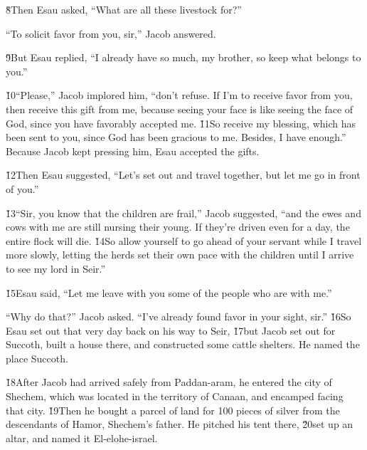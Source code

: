 \v{8}Then Esau asked, ``What are all these livestock for?''

``To solicit favor from you, sir,'' Jacob answered.

\v{9}But Esau replied, ``I already have so much, my brother, so keep what belongs to you.''

\v{10}``Please,'' Jacob implored him, ``don't refuse. If I'm to receive favor from you, then receive this gift from me, because seeing your face is like seeing the face of God, since you have favorably accepted me. \v{11}So receive my blessing, which has been sent to you, since God has been gracious to me. Besides, I have enough.'' Because Jacob kept pressing him, Esau accepted the gifts.

\v{12}Then Esau suggested, ``Let's set out and travel together, but let me go in front of you.''

\v{13}``Sir, you know that the children are frail,'' Jacob suggested, ``and the ewes and cows with me are still nursing their young. If they're driven even for a day, the entire flock will die. \v{14}So allow yourself to go ahead of your servant while I travel more slowly, letting the herds set their own pace with the children until I arrive to see my lord in Seir.''

\v{15}Esau said, ``Let me leave with you some of the people who are with me.''

``Why do that?'' Jacob asked. ``I've already found favor in your sight, sir.'' \v{16}So Esau set out that very day back on his way to Seir, \v{17}but Jacob set out for Succoth, built a house there, and constructed some cattle shelters. He named the place Succoth.

\v{18}After Jacob had arrived safely from Paddan-aram, he entered the city of Shechem, which was located in the territory of Canaan, and encamped facing that city. \v{19}Then he bought a parcel of land for 100 pieces of silver from the descendants of Hamor, Shechem's father. He pitched his tent there, \v{20}set up an altar, and named it El-elohe-israel.

